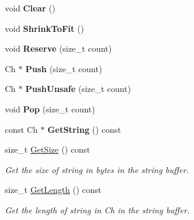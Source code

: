 \begin{DoxyCompactItemize}
\item 
void {\bfseries Clear} ()\hypertarget{class_generic_string_buffer_a42f15c959046d899cb74c3120a6995f9}{}\label{class_generic_string_buffer_a42f15c959046d899cb74c3120a6995f9}

\item 
void {\bfseries Shrink\+To\+Fit} ()\hypertarget{class_generic_string_buffer_a0dbdb77489b95923795011a24f705be5}{}\label{class_generic_string_buffer_a0dbdb77489b95923795011a24f705be5}

\item 
void {\bfseries Reserve} (size\+\_\+t count)\hypertarget{class_generic_string_buffer_a4d6becae201b98c122746298882a318f}{}\label{class_generic_string_buffer_a4d6becae201b98c122746298882a318f}

\item 
Ch $\ast$ {\bfseries Push} (size\+\_\+t count)\hypertarget{class_generic_string_buffer_a49fd10cdd5dd97a4cf9813d01334d660}{}\label{class_generic_string_buffer_a49fd10cdd5dd97a4cf9813d01334d660}

\item 
Ch $\ast$ {\bfseries Push\+Unsafe} (size\+\_\+t count)\hypertarget{class_generic_string_buffer_a4e396f55323ca54f949685c7c6ef2060}{}\label{class_generic_string_buffer_a4e396f55323ca54f949685c7c6ef2060}

\item 
void {\bfseries Pop} (size\+\_\+t count)\hypertarget{class_generic_string_buffer_a0038e53ba03c271bc4cbbac403ec4de4}{}\label{class_generic_string_buffer_a0038e53ba03c271bc4cbbac403ec4de4}

\item 
const Ch $\ast$ {\bfseries Get\+String} () const \hypertarget{class_generic_string_buffer_a42ed917a29012d932802f2709e11c572}{}\label{class_generic_string_buffer_a42ed917a29012d932802f2709e11c572}

\item 
size\+\_\+t \hyperlink{class_generic_string_buffer_abd04725d776322157be3381f5559c40b}{Get\+Size} () const \hypertarget{class_generic_string_buffer_abd04725d776322157be3381f5559c40b}{}\label{class_generic_string_buffer_abd04725d776322157be3381f5559c40b}

\begin{DoxyCompactList}\small\item\em Get the size of string in bytes in the string buffer. \end{DoxyCompactList}\item 
size\+\_\+t \hyperlink{class_generic_string_buffer_a8ad04ebc2bbe46a116613d1ed0d1eeff}{Get\+Length} () const \hypertarget{class_generic_string_buffer_a8ad04ebc2bbe46a116613d1ed0d1eeff}{}\label{class_generic_string_buffer_a8ad04ebc2bbe46a116613d1ed0d1eeff}

\begin{DoxyCompactList}\small\item\em Get the length of string in Ch in the string buffer. \end{DoxyCompactList}\end{DoxyCompactItemize}
